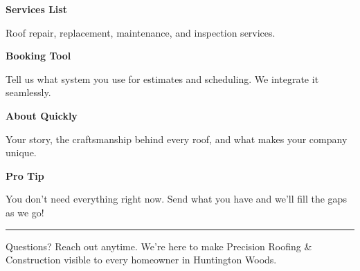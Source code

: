 \documentclass[11pt,letterpaper]{article}
\begin{document}
\begin{minipage}[t]{0.48\textwidth}
\begin{tcolorbox}[colframe=accent-teal, boxrule=1pt, left=0.7em, right=0.7em, top=0.5em, bottom=0.5em, arc=4pt, boxsep=0pt]
{\bfseries\small\color{accent-teal}Services List}

\vspace{0.15em}

{\small Roof repair, replacement, maintenance, and inspection services.}
\end{tcolorbox}

\vspace{0.1em}

\begin{tcolorbox}[colframe=accent-teal, boxrule=1pt, left=0.7em, right=0.7em, top=0.5em, bottom=0.5em, arc=4pt, boxsep=0pt]
{\bfseries\small\color{accent-teal}Booking Tool}

\vspace{0.15em}

{\small Tell us what system you use for estimates and scheduling. We integrate it seamlessly.}
\end{tcolorbox}

\vspace{0.1em}

\begin{tcolorbox}[colframe=accent-teal, boxrule=1pt, left=0.7em, right=0.7em, top=0.5em, bottom=0.5em, arc=4pt, boxsep=0pt]
{\bfseries\small\color{accent-teal}About Quickly}

\vspace{0.15em}

{\small Your story, the craftsmanship behind every roof, and what makes your company unique.}
\end{tcolorbox}

\vspace{-0.2em}
\end{minipage}

\vspace{0.15em}

\begin{tcolorbox}[colback={accent-red!5}, colframe=accent-red!20, boxrule=0.5pt, left=0.7em, right=0.7em, top=0.4em, bottom=0.4em, arc=6pt, boxsep=0pt]

{\bfseries\small\color{accent-red}Pro Tip}

\vspace{0.1em}

{\small You don't need everything right now. Send what you have and we'll fill the gaps as we go!}

\end{tcolorbox}

\vspace{0.15em}

\noindent\hrule
\vspace{0.2em}

{\small\color{text-light}Questions? Reach out anytime. We're here to make Precision Roofing \& Construction visible to every homeowner in Huntington Woods.}
\end{document}
